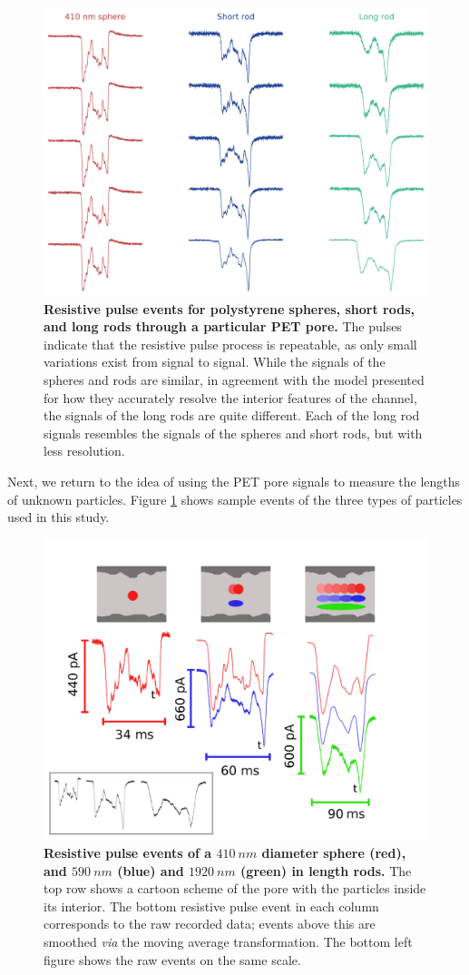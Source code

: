		
			\begin{figure}
				\includegraphics[width=\textwidth]{PET21_raw.png}
				\caption{\textbf{Resistive pulse events for polystyrene spheres, short rods, and long rods through a particular PET pore.} The pulses indicate that the resistive pulse process is repeatable, as only small variations exist from signal to signal. While the signals of the spheres and rods are similar, in agreement with the model presented for how they accurately resolve the interior features of the channel, the signals of the long rods are quite different. Each of the long rod signals resembles the signals of the spheres and short rods, but with less resolution.}
				\label{fig:PET21_raw}
			\end{figure}

		
			Next, we return to the idea of using the PET pore signals to measure the lengths of unknown particles. Figure \ref{fig:PET21_raw} shows sample events of the three types of particles used in this study.
		
			\begin{figure}
				\includegraphics[width=.5\textwidth]{PET21_qualitative}
				\caption{\textbf{Resistive pulse events of a $\SI{410}{nm}$ diameter sphere (red), and $\SI{590}{nm}$ (blue) and $\SI{1920}{nm}$ (green) in length rods.} The top row shows a cartoon scheme of the pore with the particles inside its interior. The bottom resistive pulse event in each column corresponds to the raw recorded data; events above this are smoothed \textit{via} the moving average transformation. The bottom left figure shows the raw events on the same scale.}
				\label{fig:PET21_qualitative}
			\end{figure}

